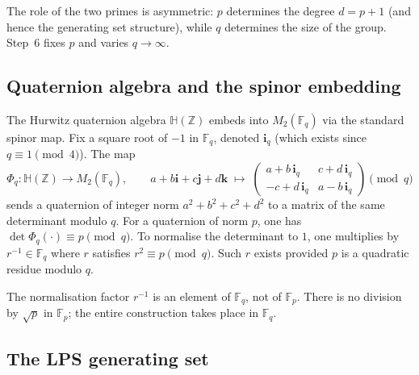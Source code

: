     \medskip\noindent
    The role of the two primes is asymmetric: $p$ determines the degree
    $d = p+1$ (and hence the generating set structure), while $q$ determines
    the size of the group.
    Step~6 fixes $p$ and varies $q \to \infty$.

  \subsection{Quaternion algebra and the spinor embedding}
    \label{sec:step6a-quat}

    The Hurwitz quaternion algebra $\mathbb{H}(\mathbb{Z})$ embeds into
    $M_2(\mathbb{F}_q)$ via the standard spinor map.
    Fix a square root of $-1$ in $\mathbb{F}_q$, denoted $\mathbf{i}_q$
    (which exists since $q \equiv 1 \pmod{4}$).
    The map
    \begin{equation}
      \Phi_q \colon \mathbb{H}(\mathbb{Z}) \longrightarrow M_2(\mathbb{F}_q),
      \qquad
      a + b\mathbf{i} + c\mathbf{j} + d\mathbf{k}
      \;\longmapsto\;
      \begin{pmatrix}
        a + b\,\mathbf{i}_q & c + d\,\mathbf{i}_q \\
        -c + d\,\mathbf{i}_q & a - b\,\mathbf{i}_q
      \end{pmatrix}
      \pmod{q}
      \label{eq:spinor-map}
    \end{equation}
    sends a quaternion of integer norm $a^2+b^2+c^2+d^2$ to a matrix of the
    same determinant modulo $q$.
    For a quaternion of norm $p$, one has
    $\det \Phi_q(\cdot) \equiv p \pmod{q}$.
    To normalise the determinant to $1$, one multiplies by $r^{-1} \in
\mathbb{F}_q$ where $r$ satisfies $r^2 \equiv p \pmod{q}$.
    Such $r$ exists provided $p$ is a quadratic residue modulo $q$.

    \begin{remark}
      The normalisation factor $r^{-1}$ is an element of $\mathbb{F}_q$,
      not of $\mathbb{F}_p$.
      There is no division by $\sqrt{p}$ in $\mathbb{F}_p$; the entire
      construction takes place in $\mathbb{F}_q$.
    \end{remark}

  \subsection{The LPS generating set}
    \label{sec:step6a-lps}

